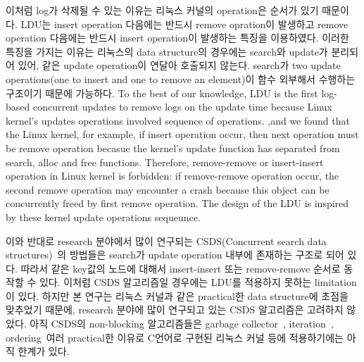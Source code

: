 \ifkor
이처럼 log가 삭제될 수 있는 이유는 리눅스 커널의 operation은 순서가
있기 때문이다.
LDU는 insert operation 다음에는 반드시 remove opration이 발생하고 remove operation 다음에는 반드시
insert operation이 발생하는 특징을 이용하였다.
이러한 특징을 가지는 이유는 리눅스의 data structure의 경우에는 search와 update가 분리되어 있어, 같은 update
operation이 연달아 호출되지 않는다.
search가 two update operations(one to insert and one to remove an element)이 함수
외부해서 수행하는 구조이기 때문에 가능하다.
\else
To the best of our knowledge, LDU is the first log-based concurrent updates to
remove logs on the update time because Linux kernel's updates
operations involved sequence of operations.
,and we found that the Linux kernel, for example, if insert operation occur,
then next operation must be remove operation becasue the kernel's update function has separated
from search, alloc and free functions.
Therefore, remove-remove or insert-insert operation in Linux kernel is
forbidden: if remove-remove operation occur, the second remove operation may
encounter a crash because this object can be concurrently freed by first remove
operation.
The design of the LDU is inspired by these kernel update operations
sequeunce.
\fi


\ifkorthesis
이와 반대로 research 분야에서 많이 연구되는 CSDS(Concurrent search data
structures)~\cite{David2015ASYNCHRONIZED}의 방법들은 search가 update operation 내부에
존재하는 구조로 되어 있다.
따라서 같은 key값의 노드에 대해서 insert-insert 또는 remove-remove 순서로 동작할 수 있다.
이처럼 CSDS 알고리즘일 경우에는 LDU를 적용하지 못하는 limitation이 있다.
하지만 본 연구는 리눅스 커널과 같은 practical한 data structure에 초점을 맞추었기 때문에, 
research 분야에 많이 연구되고 있는 CSDS 알고리즘은 고려하지 않았다.
아직 CSDS의 non-blocking 알고리즘들은 garbage collector~\cite{AlBahra2013NAS},
iteration~\cite{petrank2013lock}, ordering~\cite{zhang2013practical}여러
practical한 이유로 C언어로 구현된 리눅스 커널 등에 적용하기에는 아직 한계가 있다.
\fi


